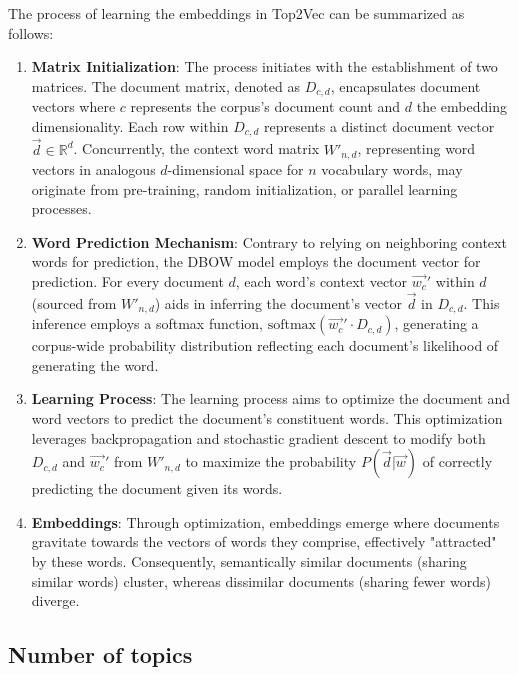 The process of learning the embeddings in Top2Vec can be summarized as follows:
\begin{enumerate}
    \item \textbf{Matrix Initialization}: The process initiates with the establishment of two matrices. The document matrix, denoted as $D_{c,d}$, encapsulates document vectors where $c$ represents the corpus's document count and $d$ the embedding dimensionality. Each row within $D_{c,d}$ represents a distinct document vector $\vec{d} \in \mathbb{R}^d$. Concurrently, the context word matrix $W'_{n,d}$, representing word vectors in analogous $d$-dimensional space for $n$ vocabulary words, may originate from pre-training, random initialization, or parallel learning processes.

    \item \textbf{Word Prediction Mechanism}: Contrary to relying on neighboring context words for prediction, the DBOW model employs the document vector for prediction. For every document $d$, each word's context vector $\vec{w_c}'$ within $d$ (sourced from $W'_{n,d}$) aids in inferring the document's vector $\vec{d}$ in $D_{c,d}$. This inference employs a softmax function, $\text{softmax}(\vec{w_c}' \cdot D_{c,d})$, generating a corpus-wide probability distribution reflecting each document's likelihood of generating the word.

    \item \textbf{Learning Process}: The learning process aims to optimize the document and word vectors to predict the document's constituent words. This optimization leverages backpropagation and stochastic gradient descent to modify both $D_{c,d}$ and $\vec{w_c}'$ from $W'_{n,d}$ to maximize the probability $P(\vec{d} | \vec{w})$ of correctly predicting the document given its words.

    \item \textbf{Embeddings}: Through optimization, embeddings emerge where documents gravitate towards the vectors of words they comprise, effectively "attracted" by these words. Consequently, semantically similar documents (sharing similar words) cluster, whereas dissimilar documents (sharing fewer words) diverge.
\end{enumerate}

\subsection{Number of topics}

